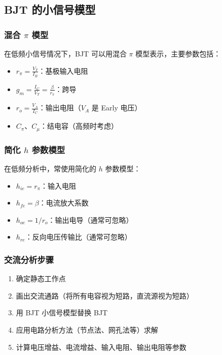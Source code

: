 \subsection{BJT 的小信号模型}

\subsubsection{混合 \texorpdfstring{$\pi$}{pi} 模型}

在低频小信号情况下，BJT 可以用混合 $\pi$ 模型表示，主要参数包括：

\begin{itemize}
  \item $r_{\pi} = \frac{V_T}{I_B}$：基极输入电阻
  \item $g_m = \frac{I_C}{V_T} = \frac{\beta}{r_{\pi}}$：跨导
  \item $r_o = \frac{V_A}{I_C}$：输出电阻（$V_A$ 是 Early 电压）
  \item $C_{\pi}$、$C_{\mu}$：结电容（高频时考虑）
\end{itemize}

\subsubsection{简化 \texorpdfstring{$h$}{h} 参数模型}

在低频分析中，常使用简化的 $h$ 参数模型：

\begin{itemize}
  \item $h_{ie} = r_{\pi}$：输入电阻
  \item $h_{fe} = \beta$：电流放大系数
  \item $h_{oe} = 1/r_o$：输出电导（通常可忽略）
  \item $h_{re}$：反向电压传输比（通常可忽略）
\end{itemize}

\subsubsection{交流分析步骤}

\begin{enumerate}
  \item 确定静态工作点
  \item 画出交流通路（将所有电容视为短路，直流源视为短路）
  \item 用 BJT 小信号模型替换 BJT
  \item 应用电路分析方法（节点法、网孔法等）求解
  \item 计算电压增益、电流增益、输入电阻、输出电阻等参数
\end{enumerate}

